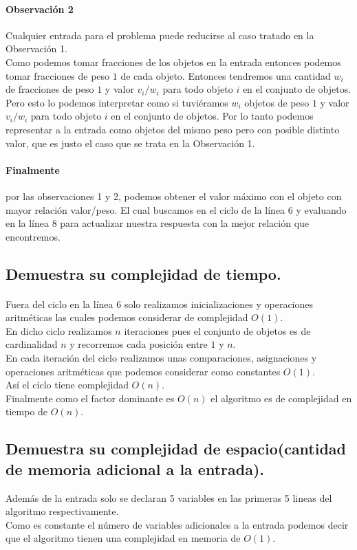 \documentclass[12pt]{article}
\begin{document}
\paragraph{Observación 2} Cualquier entrada para el problema puede reducirse al caso tratado en la Observación 1.\\
Como podemos tomar fracciones de los objetos en la entrada entonces podemos tomar fracciones de peso $1$ de cada objeto. Entonces tendremos una cantidad $w_i$ de fracciones de peso $1$ y valor $v_i/w_i$ para todo objeto $i$ en el conjunto de objetos. Pero esto lo podemos interpretar como si tuviéramos $w_i$ objetos de peso $1$ y valor $v_i/w_i$ para todo objeto $i$ en el conjunto de objetos. Por lo tanto podemos representar a la entrada como objetos del mismo peso pero con posible distinto valor, que es justo el caso que se trata en la Observación 1.
\paragraph{Finalmente} por las observaciones 1 y 2, podemos obtener el valor máximo con el objeto con mayor relación valor/peso. El cual buscamos en el ciclo de la línea 6 y evaluando en la línea 8 para actualizar nuestra respuesta con la mejor relación que encontremos.
 \subsection{Demuestra su complejidad de tiempo.}
 \paragraph{} Fuera del ciclo en la línea 6 solo realizamos inicializaciones y operaciones aritméticas las cuales podemos considerar de complejidad $O(1)$.\\
 En dicho ciclo realizamos $n$ iteraciones pues el conjunto de objetos es de cardinalidad $n$ y recorremos cada posición entre $1$ y $n$. \\ 
 En cada iteración  del ciclo realizamos unas comparaciones, asignaciones y operaciones aritméticas que podemos considerar como constantes $O(1)$.\\
 Así el ciclo tiene complejidad $O(n)$.\\
 Finalmente como el factor dominante es $O(n)$ el algoritmo es de complejidad en tiempo de $O(n)$.
 \subsection{Demuestra su complejidad de espacio(cantidad de memoria adicional a la entrada).}
 Además de la entrada solo se declaran 5 variables en las primeras 5 lineas del algoritmo respectivamente.\\
 Como es constante el número de variables adicionales a la entrada podemos decir que el algoritmo tienen una complejidad en memoria de $O(1)$.
\end{document}

